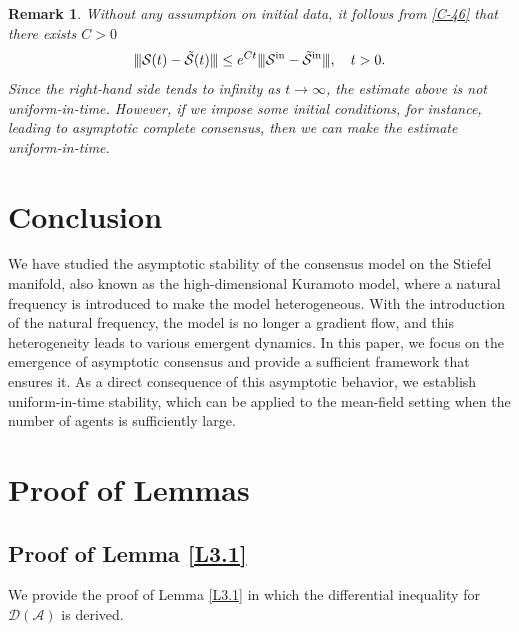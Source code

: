 \documentclass[11pt,reqno]{amsart}
\numberwithin{figure}{section}
\newcommand{\opnorm}[1]{{ \vert\kern-0.25ex \vert\kern-0.25ex \vert #1 
     \vert\kern-0.25ex \vert\kern-0.25ex \vert}}
\newcommand{\init}{  {\textup{in}} }
\newtheorem{remark}{Remark}[section]
\begin{document}
\begin{remark}
Without any assumption on initial data, it follows from \eqref{C-46} that  there exists $C>0$ 
\[
\opnorm{\mathcal S(t) -  \tilde{\mathcal S}(t)} \leq e^{Ct} \opnorm{\mathcal S^\init- \tilde{\mathcal S}^\init}, \quad t>0.
\]
Since the right-hand side tends to infinity as $t\to\infty$, the estimate above is not uniform-in-time. However, if we impose some initial conditions, for instance, leading to asymptotic complete consensus, then we can make the estimate uniform-in-time. 
\end{remark}

 \section{Conclusion} \label{sec:5}
We have studied the asymptotic stability of the consensus model on the Stiefel manifold, also known as the high-dimensional Kuramoto model, where a natural frequency is introduced to make the model heterogeneous. With the introduction of the natural frequency, the model is no longer a gradient flow, and this heterogeneity leads to various emergent dynamics. In this paper, we focus on the emergence of asymptotic consensus and provide a sufficient framework that ensures it. As a direct consequence of this asymptotic behavior, we establish uniform-in-time stability, which can be applied to the mean-field setting when the number of agents is sufficiently large.


 \appendix
 \section{Proof of Lemmas} \label{sec:A}
\setcounter{equation}{0}

\subsection{Proof of Lemma \ref{L3.1}}
We provide the proof of Lemma \ref{L3.1} in which the differential inequality for $\mathcal D(\mathcal A)$ is derived. \newline
\end{document}
